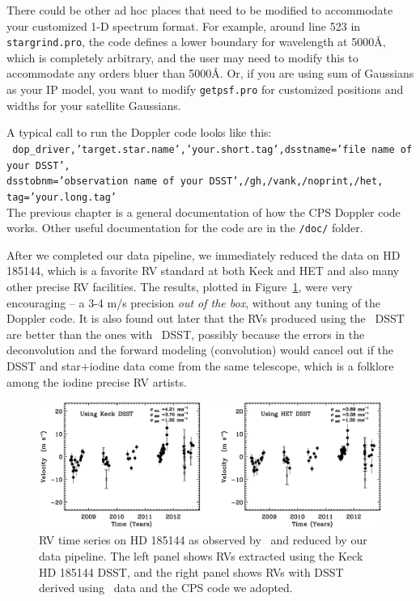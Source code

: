 There could be other ad hoc places that need to be modified to
accommodate your customized 1-D spectrum format. For example, around
line 523 in {\tt stargrind.pro}, the code defines a lower boundary for
wavelength at 5000\AA, which is completely arbitrary, and the user may
need to modify this to accommodate any orders bluer than 5000\AA. Or,
if you are using sum of Gaussians as your IP model, you want to modify
{\tt getpsf.pro} for customized positions and widths for your
satellite Gaussians.

A typical call to run the Doppler code looks like this:\\
{\tt
  dop\_driver,'target.star.name','your.short.tag',dsstname='file name
  of your DSST',\\
dsstobnm='observation name of your DSST',/gh,/vank,/noprint,/het, \\
tag='your.long.tag'
} \\ 
The previous chapter is a general documentation of how the CPS Doppler
code works. Other useful documentation for the code are in the {\tt /doc/}
folder.

After we completed our data pipeline, we immediately reduced the data
on HD 185144, which is a favorite RV standard at both Keck and HET and
also many other precise RV facilities. The results, plotted in
Figure~\ref{het:fig:sigdra}, were very encouraging -- a 3-4 m/s
precision {\em out of the box}, without any tuning of the Doppler
code. It is also found out later that the RVs produced using the \het\
DSST are better than the ones with \keck\ DSST, possibly because the
errors in the deconvolution and the forward modeling (convolution)
would cancel out if the DSST and star$+$iodine data come from the same
telescope, which is a folklore among the iodine precise RV artists.

\begin{figure}
\centering
\includegraphics[scale=0.3]{het/sigdra.eps}
\caption{RV time series on HD 185144 as observed by \het\ and reduced
  by our data pipeline. The left panel shows RVs extracted using the
  Keck HD 185144 DSST, and the right panel shows RVs with DSST derived
  using \het\ data and the CPS code we adopted.
\label{het:fig:sigdra}}
\end{figure}

